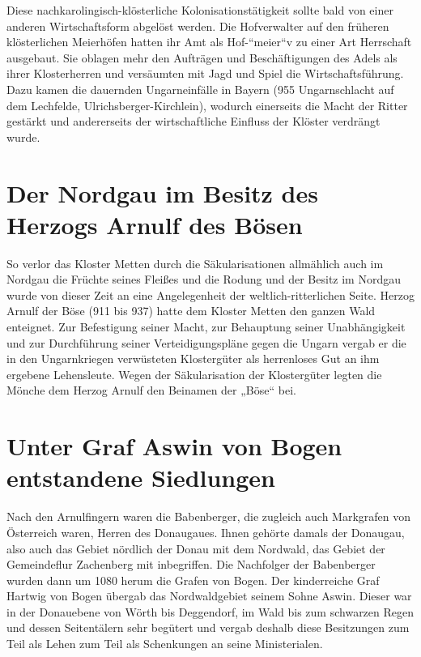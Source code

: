 \documentclass[12pt,a4pager]{book}
\begin{document}
Diese nachkarolingisch-klösterliche Kolonisationstätigkeit sollte bald von einer
anderen Wirtschaftsform abgelöst werden. Die Hofverwalter auf den früheren
klösterlichen Meierhöfen hatten ihr Amt als Hof-“meier“v zu einer Art Herrschaft
ausgebaut. Sie oblagen mehr den Aufträgen und Beschäftigungen des Adels als
ihrer Klosterherren und versäumten mit Jagd und Spiel die Wirtschaftsführung.
Dazu kamen die dauernden Ungarneinfälle in Bayern (955 Ungarnschlacht auf dem
Lechfelde, Ulrichsberger-Kirchlein), wodurch einerseits die Macht der Ritter
gestärkt und andererseits der wirtschaftliche Einfluss der Klöster verdrängt
wurde.

\section{Der Nordgau im Besitz des Herzogs Arnulf des Bösen}

So verlor das Kloster Metten durch die Säkularisationen allmählich auch im
Nordgau die Früchte seines Fleißes und die Rodung und der Besitz im Nordgau
wurde von dieser Zeit an eine Angelegenheit der weltlich-ritterlichen Seite.
Herzog Arnulf der Böse (911 bis 937) hatte dem Kloster Metten den ganzen Wald
enteignet. Zur Befestigung seiner Macht, zur Behauptung seiner Unabhängigkeit
und zur Durchführung seiner Verteidigungspläne gegen die Ungarn vergab er die in
den Ungarnkriegen verwüsteten Klostergüter als herrenloses Gut an ihm ergebene
Lehensleute. Wegen der Säkularisation der Klostergüter legten die Mönche dem
Herzog Arnulf den Beinamen der „Böse“ bei.

\section{Unter Graf Aswin von Bogen entstandene Siedlungen}

Nach den Arnulfingern waren die Babenberger, die zugleich auch Markgrafen von
Österreich waren, Herren des Donaugaues. Ihnen gehörte damals der Donaugau, also
auch das Gebiet nördlich der Donau mit dem Nordwald, das Gebiet der Gemeindeflur
Zachenberg mit inbegriffen. Die Nachfolger der Babenberger wurden dann um 1080
herum die Grafen von Bogen. Der kinderreiche Graf Hartwig von Bogen übergab das
Nordwaldgebiet seinem Sohne Aswin. Dieser war in der Donauebene von Wörth bis
Deggendorf, im Wald bis zum schwarzen Regen und dessen Seitentälern sehr
begütert und vergab deshalb diese Besitzungen zum Teil als Lehen zum Teil als
Schenkungen an seine Ministerialen.
\end{document}
